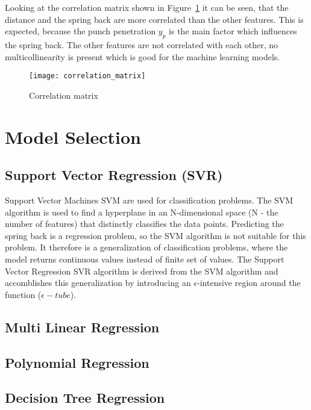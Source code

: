 Looking at the correlation matrix shown in Figure~\ref*{fig:correlation_matrix} it can be seen, that the distance and the spring back are more correlated than the other features. This is expected, because the punch penetration $y_p$ is the main factor which influences the spring back. The other features are not correlated with each other, no multicollinearity is present which is good for the machine learning models.

\begin{figure}[H]
    \centering
    \texttt{[image: correlation\_matrix]}
    \caption{Correlation matrix}
    \label{fig:correlation_matrix}
\end{figure}

\section{Model Selection}
\subsection{Support Vector Regression (SVR)}
Support Vector Machines \ac{SVM} are used for classification problems. The \ac{SVM} algorithm is used to find a hyperplane in an N-dimensional space (N - the number of features) that distinctly classifies the data points. \cite[p. 42]{awad_efficientlearningmachines_2015}
Predicting the spring back is a regression problem, so the \ac{SVM} algorithm is not suitable for this problem. It therefore is a generalization of classification problems, where the model returns continuous values instead of finite set of values.
The Support Vector Regression \ac{SVR} algorithm is derived from the \ac{SVM} algorithm and accomblishes this generalization by introducing an $\epsilon$-intensive region around the function ($\epsilon-tube$).  \cite[p. 67]{awad_efficientlearningmachines_2015}

\subsection{Multi Linear Regression}
\subsection{Polynomial Regression}
\subsection{Decision Tree Regression}
